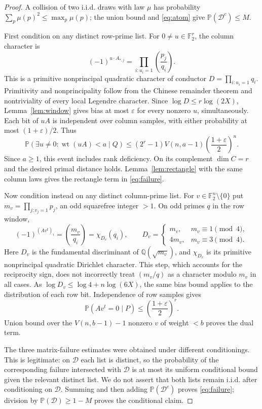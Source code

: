 \documentclass[11pt]{article}
\theoremstyle{remark}\newtheorem{remark}[theorem]{Remark}
\newcommand{\F}{\mathbb F_2}
\newcommand{\Prb}{\mathbb P}
\newcommand{\wt}{\operatorname{wt}}
\newcommand{\Leg}[2]{\left(\frac{#1}{#2}\right)}
\newcommand{\eps}{\varepsilon}
\begin{document}
\begin{proof}
A collision of two i.i.d. draws with law $\mu$ has probability $\sum_p\mu(p)^2\le\max_p\mu(p)$; the union bound and \eqref{eq:atom} give $\Prb(\mathcal D^c)\le M$.

First condition on any distinct row-prime list. For $0\ne u\in\F^r$, the column character is
\[
 (-1)^{u\cdot A_{*,j}}=\prod_{i:u_i=1}\Leg{p_j}{q_i}.
\]
This is a primitive nonprincipal quadratic character of conductor $D=\prod_{i:u_i=1}q_i$. Primitivity and nonprincipality follow from the Chinese remainder theorem and nontriviality of every local Legendre character. Since $\log D\le r\log(2X)$, Lemma~\ref{lem:window} gives bias at most $\eps$ for every nonzero $u$, simultaneously. Each bit of $uA$ is independent over column samples, with either probability at most $(1+\eps)/2$. Thus
\[
 \Prb(\exists u\ne0:\wt(uA)<a\mid Q)
 \le (2^r-1)V(n,a-1)\left(\frac{1+\eps}{2}\right)^n.
\]
Since $a\ge1$, this event includes rank deficiency. On its complement $\dim C=r$ and the desired primal distance holds. Lemma~\ref{lem:rectangle} with the same column laws gives the rectangle term in \eqref{eq:failure}.

Now condition instead on any distinct column-prime list. For $v\in\F^n\setminus\{0\}$ put $m_v=\prod_{j:v_j=1}p_j$, an odd squarefree integer $>1$. On odd primes $q$ in the row window,
\[
 (-1)^{(Av^t)_i}=\Leg{m_v}{q_i}=\chi_{D_v}(q_i),\qquad
 D_v=\begin{cases}m_v,&m_v\equiv1\pmod4,\\4m_v,&m_v\equiv3\pmod4.\end{cases}
\]
Here $D_v$ is the fundamental discriminant of $\mathbb Q(\sqrt{m_v})$, and $\chi_{D_v}$ is its primitive nonprincipal quadratic Dirichlet character. This step, which accounts for the reciprocity sign, does not incorrectly treat $(m_v/q)$ as a character modulo $m_v$ in all cases. As $\log D_v\le\log4+n\log(6X)$, the same bias bound applies to the distribution of each row bit. Independence of row samples gives
\[
 \Prb(Av^t=0\mid P)\le\left(\frac{1+\eps}{2}\right)^r.
\]
Union bound over the $V(n,b-1)-1$ nonzero $v$ of weight $<b$ proves the dual term.

The three matrix-failure estimates were obtained under different conditionings. This is legitimate: on $\mathcal D$ each list is distinct, so the probability of the corresponding failure intersected with $\mathcal D$ is at most its uniform conditional bound given the relevant distinct list. We do not assert that both lists remain i.i.d. after conditioning on $\mathcal D$. Summing and then adding $\Prb(\mathcal D^c)$ proves \eqref{eq:failure}; division by $\Prb(\mathcal D)\ge1-M$ proves the conditional claim.
\end{proof}
\end{document}

